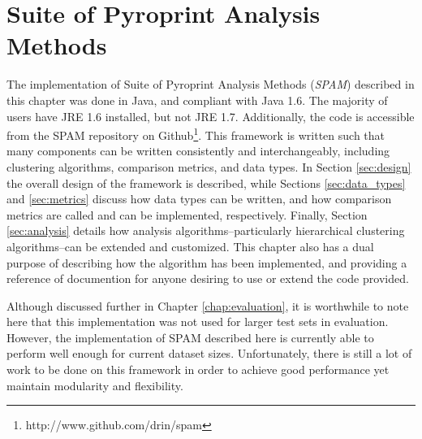 \documentclass[12pt]{ucthesis}
\begin{document}
\chapter{Suite of Pyroprint Analysis Methods}\label{chap:implementation}
   The implementation of Suite of Pyroprint Analysis Methods (\textit{SPAM})
   described in this chapter was done in Java, and compliant with Java 1.6. The
   majority of users have JRE 1.6 installed, but not JRE 1.7. Additionally, the
   code is accessible from the SPAM repository on
   Github\footnote{http://www.github.com/drin/spam}. This framework is written
   such that many components can be written consistently and interchangeably,
   including clustering algorithms, comparison metrics, and data types. In
   Section \ref{sec:design} the overall design of the framework is described,
   while Sections \ref{sec:data_types} and \ref{sec:metrics} discuss how data
   types can be written, and how comparison metrics are called and can be
   implemented, respectively. Finally, Section \ref{sec:analysis} details how
   analysis algorithms--particularly hierarchical clustering algorithms--can be
   extended and customized. This chapter also has a dual purpose of describing
   how the algorithm has been implemented, and providing a reference of
   documention for anyone desiring to use or extend the code provided.

   Although discussed further in Chapter \ref{chap:evaluation}, it is
   worthwhile to note here that this implementation was not used for larger
   test sets in evaluation. However, the implementation of SPAM described here
   is currently able to perform well enough for current dataset sizes.
   Unfortunately, there is still a lot of work to be done on this framework in
   order to achieve good performance yet maintain modularity and flexibility.
\end{document}
